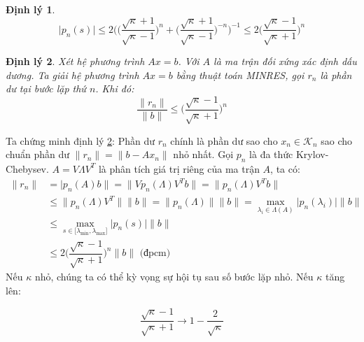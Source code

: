 \documentclass[14pt, a4paper]{article}
\numberwithin{equation}{section}
\numberwithin{algorithm}{section}
\numberwithin{figure}{section}
\newtheorem{dl}{Định lý}
\numberwithin{dl}{section}
\numberwithin{md}{section}
\numberwithin{bd}{section}
\numberwithin{dn}{section}
\begin{document}
\begin{enumerate}[a)]
\begin{dl}
        \begin{equation}
            \lvert p_n(s) \rvert \leq 2 \Bigg( \Big(\dfrac{\sqrt{\kappa} + 1}{\sqrt{\kappa}-1}\Big)^n + \Big(\dfrac{\sqrt{\kappa} + 1}{\sqrt{\kappa}-1}\Big)^{-n}\Bigg)^{-1} \leq 2 \Big ( \dfrac{\sqrt{\kappa} - 1}{\sqrt{\kappa} + 1} \Big)^n
        \end{equation}
    \end{dl}

    \begin{dl} \label{dl:MINRES-RESIDUAL-CHEBYSEV}
        Xét hệ phương trình $Ax=b$. Với $A$ là ma trận đối xứng xác định dấu dương. Ta giải hệ phương trình $Ax=b$ bằng thuật toán MINRES, gọi $r_n$ là phần dư tại bước lặp thứ $n$. Khi đó:
        \begin{equation} \label{eq:MINRES-A-SPD-UPPER-BOUND}
            \dfrac{\lVert r_n \rVert }{\lVert b \rVert} \leq \Big(\dfrac{\sqrt{\kappa} - 1}{\sqrt{\kappa} + 1}\Big)^n
        \end{equation}
    \end{dl}
    Ta chứng minh định lý \ref{dl:MINRES-RESIDUAL-CHEBYSEV}: Phần dư $r_n$ chính là phần dư sao cho $x_n \in \mathcal{K}_n$ sao cho chuẩn phần dư $\lVert r_n \rVert = \lVert b - Ax_n \rVert$ nhỏ nhất. Gọi $p_n$ là đa thức Krylov-Chebysev. $A=V \Lambda V^T$ là phân tích giá trị riêng của ma trận $A$, ta có:
    \begin{equation}
        \begin{aligned}
        \lVert r_n \rVert &= \lvert p_n(A)b \rVert=\lVert V p_n(\Lambda) V^T b \rVert = \lVert p_n(\Lambda) V^T b \rVert \\
        & \leq \lVert p_n(\Lambda) V^T \rVert \lVert b \rVert = \lVert p_n(\Lambda) \rVert \lVert b \rVert = \max_{\lambda_i \in \Lambda(A)} \lvert p_n(\lambda_i) \rvert \lVert b \rVert \\
        & \leq \max_{s \in \lbrack \lambda_{\min}, \lambda_{\max} \rbrack} \lvert p_n(s) \rvert \lVert b \rVert \\
        & \leq 2 \Big( \dfrac{\sqrt{\kappa}-1}{\sqrt{\kappa} + 1}\Big)^n \lVert b \rVert \text{ (đpcm) } 
        \end{aligned}
    \end{equation}
    Nếu $\kappa$ nhỏ, chúng ta có thể kỳ vọng sự hội tụ sau số bước lặp nhỏ. Nếu $\kappa$ tăng lên:

    \begin{equation}
        \dfrac{\sqrt{\kappa}-1}{\sqrt{\kappa} + 1} \rightarrow 1 - \dfrac{2}{\sqrt{\kappa}}
    \end{equation}


\end{enumerate}
\end{document}
